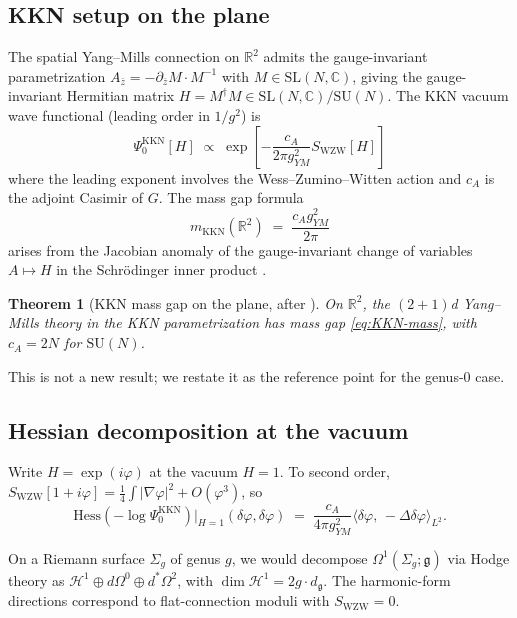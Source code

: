 \documentclass[11pt,letterpaper]{article}
\newtheorem{theorem}{Theorem}[section]
\theoremstyle{definition}
\newcommand{\bbR}{\mathbb{R}}
\newcommand{\bbC}{\mathbb{C}}
\newcommand{\fg}{\mathfrak{g}}
\newcommand{\Hess}{\mathrm{Hess}}
\newcommand{\Lap}{\Delta}
\newcommand{\dimG}{d_{\fg}}
\begin{document}
\subsection{KKN setup on the plane}

The spatial Yang--Mills connection on $\bbR^2$ admits the gauge-invariant parametrization $A_{\bar z} = -\partial_{\bar z} M\cdot M^{-1}$ with $M \in \mathrm{SL}(N,\bbC)$, giving the gauge-invariant Hermitian matrix $H = M^\dagger M \in \mathrm{SL}(N,\bbC)/\mathrm{SU}(N)$. The KKN vacuum wave functional (leading order in $1/g^2$) is
\begin{equation}\label{eq:KKN-Psi0}
\Psi_0^{\mathrm{KKN}}[H] \;\propto\; \exp\!\left[-\frac{c_A}{2\pi g^2_{YM}} S_{\mathrm{WZW}}[H]\right]
\end{equation}
where the leading exponent involves the Wess--Zumino--Witten action and $c_A$ is the adjoint Casimir of $G$. The mass gap formula
\begin{equation}\label{eq:KKN-mass}
m_{\mathrm{KKN}}(\bbR^2) \;=\; \frac{c_A g^2_{YM}}{2\pi}
\end{equation}
arises from the Jacobian anomaly of the gauge-invariant change of variables $A \mapsto H$ in the Schr\"odinger inner product \cite{KKN1998}.

\begin{theorem}[KKN mass gap on the plane, after \cite{KKN1998}]\label{thm:KKN-gap-planar}
On $\bbR^2$, the $(2{+}1)$d Yang--Mills theory in the KKN parametrization has mass gap \eqref{eq:KKN-mass}, with $c_A = 2N$ for $\mathrm{SU}(N)$.
\end{theorem}

This is not a new result; we restate it as the reference point for the genus-$0$ case.

\subsection{Hessian decomposition at the vacuum}

Write $H = \exp(i\varphi)$ at the vacuum $H=1$. To second order, $S_{\mathrm{WZW}}[1+i\varphi] = \tfrac{1}{4}\int|\nabla\varphi|^2 + O(\varphi^3)$, so
\begin{equation}\label{eq:Hess-KKN}
\Hess(-\log\Psi_0^{\mathrm{KKN}})\bigl|_{H=1}(\delta\varphi,\delta\varphi)
\;=\; \frac{c_A}{4\pi g^2_{YM}}\bigl\langle \delta\varphi,\,-\Lap\delta\varphi\bigr\rangle_{L^2}.
\end{equation}

On a Riemann surface $\Sigma_g$ of genus $g$, we would decompose $\Omega^1(\Sigma_g;\fg)$ via Hodge theory as $\mathcal{H}^1 \oplus d\Omega^0 \oplus d^*\Omega^2$, with $\dim \mathcal{H}^1 = 2g\cdot\dimG$. The harmonic-form directions correspond to flat-connection moduli with $S_{\mathrm{WZW}} = 0$.
\end{document}
